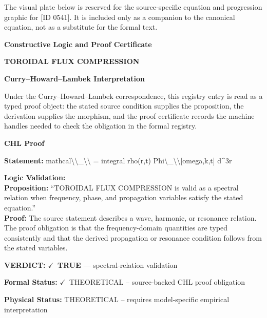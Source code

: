\begingroup\footnotesize\sloppy
The visual plate below is reserved for the source-specific equation and progression graphic for [ID 0541]. It is included only as a companion to the canonical equation, not as a substitute for the formal text.
\par\endgroup
\ifTZPDarkEdition
{}
\fi

\clearpage
\begingroup\tzpsupportsetup
\noindent\textbf{\fontsize{10.8pt}{12.8pt}\selectfont [ID 0541] Constructive Logic and Proof Certificate}\par
\noindent\textbf{\fontsize{10pt}{12pt}\selectfont TOROIDAL FLUX COMPRESSION}\par
\vspace{0.45em}
\begingroup
\footnotesize
\setlength{\parskip}{0.22em}
\setlength{\parindent}{0pt}
\noindent\textbf{Curry--Howard--Lambek Interpretation}\par
Under the Curry--Howard--Lambek correspondence, this registry entry is read as a typed proof
object: the stated source condition supplies the proposition, the derivation supplies the
morphism, and the proof certificate records the machine handles needed to check the obligation
in the formal registry.

\vspace{0.45em}
\noindent\textbf{CHL Proof}\par
\textbf{Statement:} mathcal\textbackslash{}\textbackslash{}\_\textbackslash{}\textbackslash{} = integral rho(r,t) Phi\textbackslash{}\_\textbackslash{}\textbackslash{}[omega,k,t] d\textasciicircum{}3r

\textbf{Logic Validation:}\\
\textbf{Proposition:} ``TOROIDAL FLUX COMPRESSION is valid as a spectral relation when frequency, phase, and
propagation variables satisfy the stated equation.''\\
\textbf{Proof:} The source statement describes a wave, harmonic, or resonance relation. The proof
obligation is that the frequency-domain quantities are typed consistently and that the
derived propagation or resonance condition follows from the stated variables.

\textbf{VERDICT:} \ensuremath{\checkmark}\ \textbf{TRUE} --- spectral-relation validation

\textbf{Formal Status:} \ensuremath{\checkmark}\ THEORETICAL -- source-backed CHL proof obligation

\textbf{Physical Status:} THEORETICAL -- requires model-specific empirical interpretation
\par\vspace{0.45em}
\par
\ifTZPDarkEdition
{}
\fi
\endgroup
\endgroup
